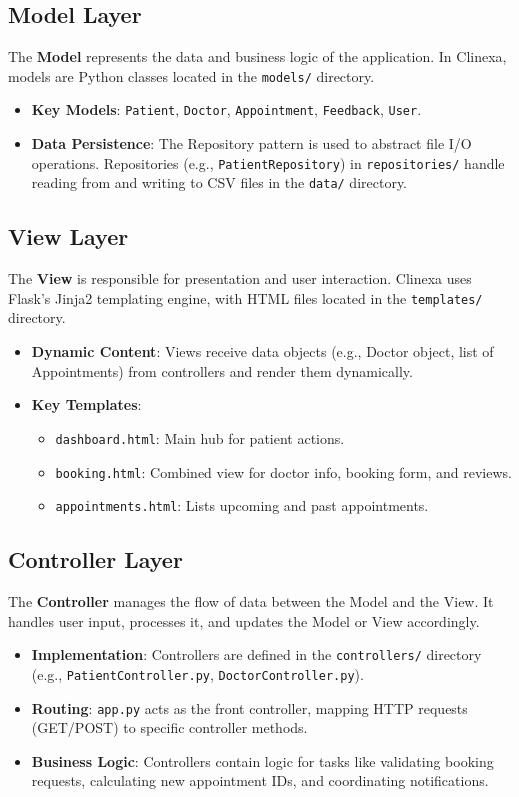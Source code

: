 \documentclass[12pt,a4paper]{article}
\begin{document}
\subsection{Model Layer}
The \textbf{Model} represents the data and business logic of the application. In Clinexa, models are Python classes located in the \texttt{models/} directory.
\begin{itemize}
    \item \textbf{Key Models}: \texttt{Patient}, \texttt{Doctor}, \texttt{Appointment}, \texttt{Feedback}, \texttt{User}.
    \item \textbf{Data Persistence}: The Repository pattern is used to abstract file I/O operations. Repositories (e.g., \texttt{PatientRepository}) in \texttt{repositories/} handle reading from and writing to CSV files in the \texttt{data/} directory.
\end{itemize}

\subsection{View Layer}
The \textbf{View} is responsible for presentation and user interaction. Clinexa uses Flask's Jinja2 templating engine, with HTML files located in the \texttt{templates/} directory.
\begin{itemize}
    \item \textbf{Dynamic Content}: Views receive data objects (e.g., Doctor object, list of Appointments) from controllers and render them dynamically.
    \item \textbf{Key Templates}: 
    \begin{itemize}
        \item \texttt{dashboard.html}: Main hub for patient actions.
        \item \texttt{booking.html}: Combined view for doctor info, booking form, and reviews.
        \item \texttt{appointments.html}: Lists upcoming and past appointments.
    \end{itemize}
\end{itemize}

\subsection{Controller Layer}
The \textbf{Controller} manages the flow of data between the Model and the View. It handles user input, processes it, and updates the Model or View accordingly.
\begin{itemize}
    \item \textbf{Implementation}: Controllers are defined in the \texttt{controllers/} directory (e.g., \texttt{PatientController.py}, \texttt{DoctorController.py}).
    \item \textbf{Routing}: \texttt{app.py} acts as the front controller, mapping HTTP requests (GET/POST) to specific controller methods.
    \item \textbf{Business Logic}: Controllers contain logic for tasks like validating booking requests, calculating new appointment IDs, and coordinating notifications.
\end{itemize}
\end{document}
